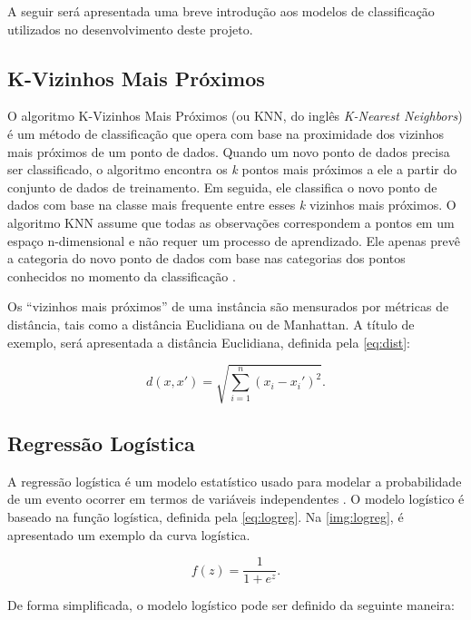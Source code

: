 A seguir será apresentada uma breve introdução aos modelos de classificação utilizados no desenvolvimento deste projeto.

\subsection{K-Vizinhos Mais Próximos}

O algoritmo K-Vizinhos Mais Próximos (ou KNN, do inglês \textit{K-Nearest Neighbors}) é um método de classificação que opera com base na proximidade dos vizinhos mais próximos de um ponto de dados. Quando um novo ponto de dados precisa ser classificado, o algoritmo encontra os \textit{k} pontos mais próximos a ele a partir do conjunto de dados de treinamento. Em seguida, ele classifica o novo ponto de dados com base na classe mais frequente entre esses \textit{k} vizinhos mais próximos.
O algoritmo KNN assume que todas as observações correspondem a pontos em um espaço n-dimensional e não requer um processo de aprendizado. Ele apenas prevê a categoria do novo ponto de dados com base nas categorias dos pontos conhecidos no momento da classificação \cite{Wang_2019}.

Os “vizinhos mais próximos” de uma instância são mensurados por métricas de distância, tais como a distância Euclidiana ou de Manhattan. A título de exemplo, será apresentada a distância Euclidiana, definida pela \autoref{eq:dist}:

\begin{equation}
\label{eq:dist}
    d(x, x') = \sqrt{\sum_{i=1}^{n} (x_i - x_i')^2}.
\end{equation}

\subsection{Regress\~ao Logística}

A regressão logística é um modelo estatístico usado para modelar a probabilidade de um evento ocorrer em termos de variáveis independentes \cite{logreg}. O modelo logístico é baseado na função logística, definida pela \autoref{eq:logreg}. Na \autoref{img:logreg}, é apresentado um exemplo da curva logística.

\begin{equation}
    \label{eq:logreg}
    f(z) = \frac{1}{1 + e^z}.
\end{equation}

De forma simplificada, o modelo logístico pode ser definido da seguinte maneira:

